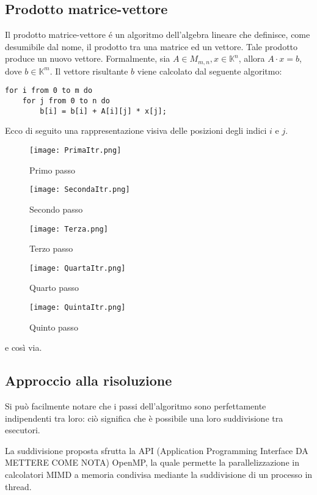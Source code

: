 \subsection{Prodotto matrice-vettore}
Il prodotto matrice-vettore é un algoritmo dell'algebra lineare che definisce, come desumibile dal nome, il prodotto tra una matrice ed un vettore. Tale prodotto produce un nuovo vettore.
Formalmente, sia $A \in M_{m,n}, x \in \mathbb{K}^n$, allora $A\cdot x = b$, dove $b \in \mathbb{K}^m$.
Il vettore risultante $b$ viene calcolato dal seguente algoritmo:
\begin{lstlisting}
for i from 0 to m do
    for j from 0 to n do
        b[i] = b[i] + A[i][j] * x[j];
\end{lstlisting}
Ecco di seguito una rappresentazione visiva delle posizioni degli indici $i$ e $j$.
\begin{figure}[h]
    \centering
    \texttt{[image: PrimaItr.png]}
    \caption{Primo passo}
    \label{fig:enter-label}    
\end{figure}
\begin{figure}[h]
    \centering
    \texttt{[image: SecondaItr.png]}
    \caption{Secondo passo}
    \label{fig:enter-label}    
\end{figure}
\begin{figure}[h]
    \centering
    \texttt{[image: Terza.png]}
    \caption{Terzo passo}
    \label{fig:enter-label}    
\end{figure}
\begin{figure}[h]
    \centering
    \texttt{[image: QuartaItr.png]}
    \caption{Quarto passo}
    \label{fig:enter-label}    
\end{figure}
\begin{figure}[h]
    \centering
    \texttt{[image: QuintaItr.png]}
    \caption{Quinto passo}
    \label{fig:enter-label}    
\end{figure}
e così via.


\subsection{Approccio alla risoluzione}
Si può facilmente notare che i passi dell'algoritmo sono perfettamente indipendenti tra loro: ciò significa che è possibile una loro suddivisione tra esecutori.

La suddivisione proposta sfrutta la API (Application Programming Interface DA METTERE COME NOTA) OpenMP, la quale permette la parallelizzazione in calcolatori MIMD a memoria condivisa mediante la suddivisione di un processo in thread.
